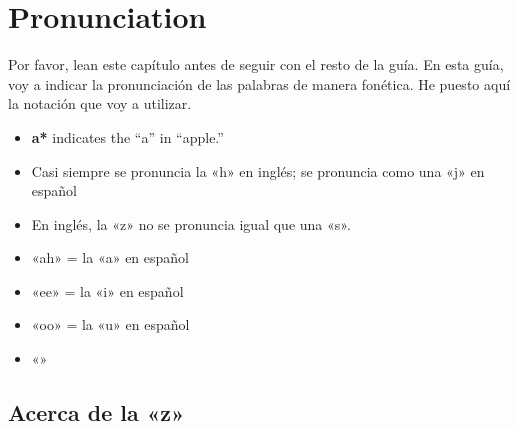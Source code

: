 \chapter{Pronunciation}

Por favor, lean este cap\'itulo antes de seguir con el resto de la gu\'ia.
En esta guía, voy a indicar la pronunciaci\'on de las palabras de manera fon\'etica.
He puesto aquí la notaci\'on que voy a utilizar.


\begin{itemize}
	\item \textbf{a*} indicates the ``a'' in ``apple.''
	\item Casi siempre se pronuncia la «h» en inglés;
			se pronuncia como una «j» en espa\~nol
	\item En inglés, la «z» no se pronuncia igual que una «s».
	\item «ah» = la «a» en espa\~nol
	\item «ee» = la «i» en espa\~nol
	\item «oo» = la «u» en español
	\item «»
\end{itemize}

\section{Acerca de la «z»}

